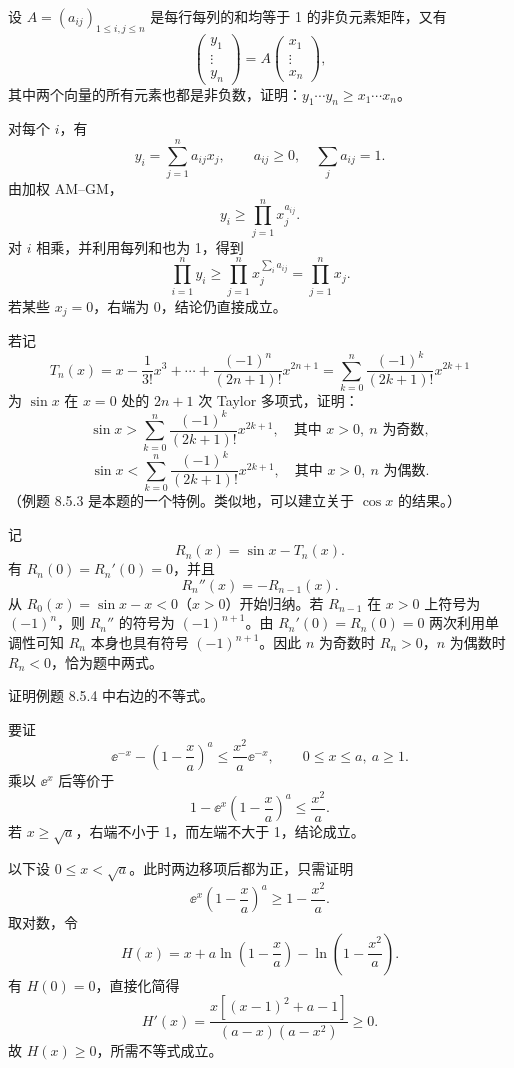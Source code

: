 \begin{xexercise}[14]
设 $A=(a_{ij})_{1\le i,j\le n}$ 是每行每列的和均等于 1 的非负元素矩阵，又有
  \[
    \begin{pmatrix}y_1\\\vdots\\y_n\end{pmatrix}
    =A\begin{pmatrix}x_1\\\vdots\\x_n\end{pmatrix},
  \]
  其中两个向量的所有元素也都是非负数，证明：$y_1\cdots y_n\ge x_1\cdots x_n$。
\end{xexercise}
\begin{xsolution}
对每个 $i$，有
\[
  y_i=\sum_{j=1}^n a_{ij}x_j,
  \qquad a_{ij}\ge0,\quad \sum_j a_{ij}=1.
\]
由加权 AM--GM，
\[
  y_i\ge\prod_{j=1}^n x_j^{a_{ij}}.
\]
对 $i$ 相乘，并利用每列和也为 1，得到
\[
  \prod_{i=1}^n y_i
  \ge\prod_{j=1}^n x_j^{\sum_i a_{ij}}
  =\prod_{j=1}^n x_j.
\]
若某些 $x_j=0$，右端为 0，结论仍直接成立。
\end{xsolution}


\begin{xexercise}[15]
若记
  \[
    T_n(x)=x-\frac1{3!}x^3+\cdots+\frac{(-1)^n}{(2n+1)!}x^{2n+1}
    =\sum_{k=0}^n\frac{(-1)^k}{(2k+1)!}x^{2k+1}
  \]
  为 $\sin x$ 在 $x=0$ 处的 $2n+1$ 次 Taylor 多项式，证明：
  \[
    \sin x>\sum_{k=0}^n\frac{(-1)^k}{(2k+1)!}x^{2k+1},
    \quad\text{其中 }x>0,\ n\text{ 为奇数},
  \]
  \[
    \sin x<\sum_{k=0}^n\frac{(-1)^k}{(2k+1)!}x^{2k+1},
    \quad\text{其中 }x>0,\ n\text{ 为偶数}.
  \]
  （例题 8.5.3 是本题的一个特例。类似地，可以建立关于 $\cos x$ 的结果。）
\end{xexercise}
\begin{xsolution}
记
\[
  R_n(x)=\sin x-T_n(x).
\]
有 $R_n(0)=R_n'(0)=0$，并且
\[
  R_n''(x)=-R_{n-1}(x).
\]
从 $R_0(x)=\sin x-x<0$（$x>0$）开始归纳。若 $R_{n-1}$ 在 $x>0$ 上符号为 $(-1)^n$，则 $R_n''$ 的符号为 $(-1)^{n+1}$。由 $R_n'(0)=R_n(0)=0$ 两次利用单调性可知 $R_n$ 本身也具有符号 $(-1)^{n+1}$。因此 $n$ 为奇数时 $R_n>0$，$n$ 为偶数时 $R_n<0$，恰为题中两式。
\end{xsolution}


\begin{xexercise}[16]
证明例题 8.5.4 中右边的不等式。
\end{xexercise}
\begin{xsolution}
要证
\[
  \ee^{-x}-\left(1-\frac xa\right)^a
  \le\frac{x^2}{a}\ee^{-x},
  \qquad 0\le x\le a,\ a\ge1.
\]
乘以 $\ee^x$ 后等价于
\[
  1-\ee^x\left(1-\frac xa\right)^a\le\frac{x^2}{a}.
\]
若 $x\ge\sqrt a$，右端不小于 1，而左端不大于 1，结论成立。

以下设 $0\le x<\sqrt a$。此时两边移项后都为正，只需证明
\[
  \ee^x\left(1-\frac xa\right)^a\ge1-\frac{x^2}{a}.
\]
取对数，令
\[
  H(x)=x+a\ln\left(1-\frac xa\right)
       -\ln\left(1-\frac{x^2}{a}\right).
\]
有 $H(0)=0$，直接化简得
\[
  H'(x)=
  \frac{x[(x-1)^2+a-1]}{(a-x)(a-x^2)}\ge0.
\]
故 $H(x)\ge0$，所需不等式成立。
\end{xsolution}


